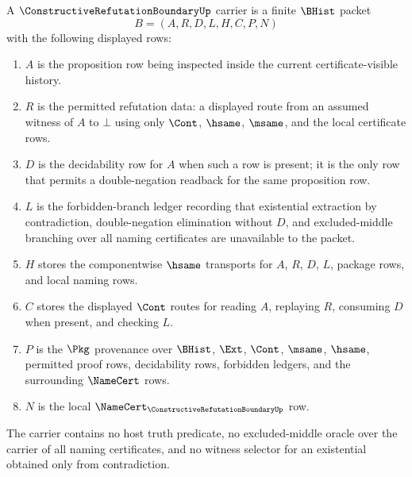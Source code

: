 \begin{definition}
\label{def:reasoning-contradiction-boundary-carrier}
A $\ConstructiveRefutationBoundaryUp$ carrier is a finite $\BHist$ packet
$$
B=(A,R,D,L,H,C,P,N)
$$
with the following displayed rows:
\begin{enumerate}
\item $A$ is the proposition row being inspected inside the current certificate-visible history.
\item $R$ is the permitted refutation data: a displayed route from an assumed witness of $A$ to $\bot$ using only $\Cont$, $\hsame$, $\msame$, and the local certificate rows.
\item $D$ is the decidability row for $A$ when such a row is present; it is the only row that permits a double-negation readback for the same proposition row.
\item $L$ is the forbidden-branch ledger recording that existential extraction by contradiction, double-negation elimination without $D$, and excluded-middle branching over all naming certificates are unavailable to the packet.
\item $H$ stores the componentwise $\hsame$ transports for $A$, $R$, $D$, $L$, package rows, and local naming rows.
\item $C$ stores the displayed $\Cont$ routes for reading $A$, replaying $R$, consuming $D$ when present, and checking $L$.
\item $P$ is the $\Pkg$ provenance over $\BHist$, $\Ext$, $\Cont$, $\msame$, $\hsame$, permitted proof rows, decidability rows, forbidden ledgers, and the surrounding $\NameCert$ rows.
\item $N$ is the local $\NameCert_{\ConstructiveRefutationBoundaryUp}$ row.
\end{enumerate}
The carrier contains no host truth predicate, no excluded-middle oracle over the carrier of all naming certificates, and no witness selector for an existential obtained only from contradiction.
\end{definition}

